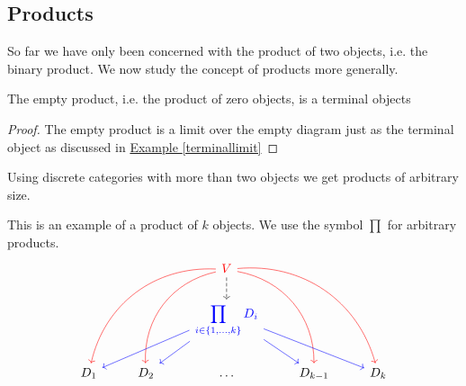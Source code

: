 \subsection{Products}
So far we have only been concerned with the product of two objects, i.e. the binary product.
We now study the concept of products more generally.
\begin{lemma}
  \label{emptyproduct}
  The empty product, i.e. the product of zero objects, is a terminal objects
\end{lemma}
\begin{proof}
  The empty product is a limit over the empty diagram just as the terminal object
  as discussed in
  \hyperref[terminallimit]{Example \ref*{terminallimit}}
\end{proof}

Using discrete categories with more than two objects
we get products of arbitrary size.
\begin{example}
  This is an example of a product of $k$ objects. We use the symbol $\prod$ for
  arbitrary products.
  \[
    \begin{tikzcd}
      && {\color{red} V}
      \arrow[bend right=40,color=red]{ddll}
      \arrow[bend right=40,color=red]{ddl}
      \arrow[bend left=40,color=red]{ddrr}
      \arrow[bend left=40,color=red]{ddr}
      \arrow[dashed]{d} &&\\
      && {\color{blue} {\displaystyle \prod_{i \in \{1,\ldots,k\} } D_i}}
      \arrow[color=blue]{dl}
      \arrow[color=blue]{dll}
      \arrow[color=blue]{dr}
      \arrow[color=blue]{drr} &&\\
      D_1 & D_2 & \ldots & D_{k-1} & D_k
    \end{tikzcd}
  \]
\end{example}

